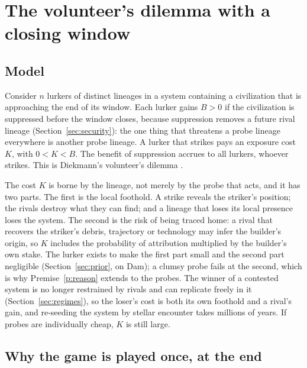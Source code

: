 \documentclass[preprint,12pt]{elsarticle}
\theoremstyle{definition}
\begin{document}
\section{The volunteer's dilemma with a closing window}
\label{sec:vd}

\subsection{Model}

Consider $n$ lurkers of distinct lineages in a system containing a civilization that is approaching the end of its window. Each lurker gains $B > 0$ if the civilization is suppressed before the window closes, because suppression removes a future rival lineage (Section~\ref{sec:security}): the one thing that threatens a probe lineage everywhere is another probe lineage. A lurker that strikes pays an exposure cost $K$, with $0 < K < B$. The benefit of suppression accrues to all lurkers, whoever strikes. This is Diekmann's volunteer's dilemma \citep{Diekmann1985}.

The cost $K$ is borne by the lineage, not merely by the probe that acts, and it has two parts. The first is the local foothold. A strike reveals the striker's position; the rivals destroy what they can find; and a lineage that loses its local presence loses the system. The second is the risk of being traced home: a rival that recovers the striker's debris, trajectory or technology may infer the builder's origin, so $K$ includes the probability of attribution multiplied by the builder's own stake. The lurker exists to make the first part small and the second part negligible (Section~\ref{sec:prior}, on Dam); a clumsy probe fails at the second, which is why Premise~\ref{p:reason} extends to the probes. The winner of a contested system is no longer restrained by rivals and can replicate freely in it (Section~\ref{sec:regimes}), so the loser's cost is both its own foothold and a rival's gain, and re-seeding the system by stellar encounter takes millions of years. If probes are individually cheap, $K$ is still large.

\subsection{Why the game is played once, at the end}
\label{sec:lastmoment}
\end{document}
